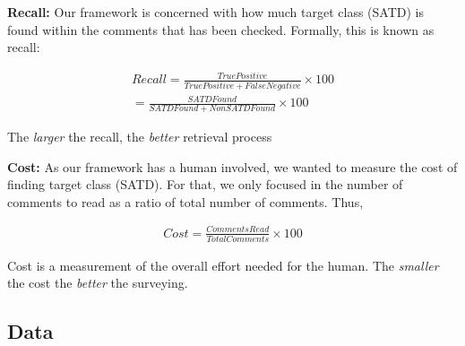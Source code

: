 \documentclass[10pt,conference]{IEEEtran}
\begin{document}



\textbf{Recall:} Our framework is concerned with how much target class (SATD) is found within the comments that has been checked. 
Formally, this is known as recall:


\begin{equation}
    \begin{aligned}
    Recall = \frac{True Positive}{True Positive + False Negative} \times 100\\
    = \frac{SATD Found}{SATD Found + Non SATD Found} \times 100 
    \end{aligned}
\end{equation}

 
The {\em larger} the recall,
the {\em better} retrieval process


\textbf{Cost:} As our framework has a human involved, we wanted to measure the cost of finding target class (SATD). 
For that, we only focused in the number of comments to read as a ratio of total number of comments. Thus, 

\begin{equation}
    \begin{aligned}
    Cost = \frac{Comments Read}{Total Comments} \times 100
    \end{aligned}
\end{equation}

Cost is a measurement of the overall effort needed for the human. 
The {\em smaller}  the cost the {\em better} the surveying. 



\subsection{Data}
\end{document}
